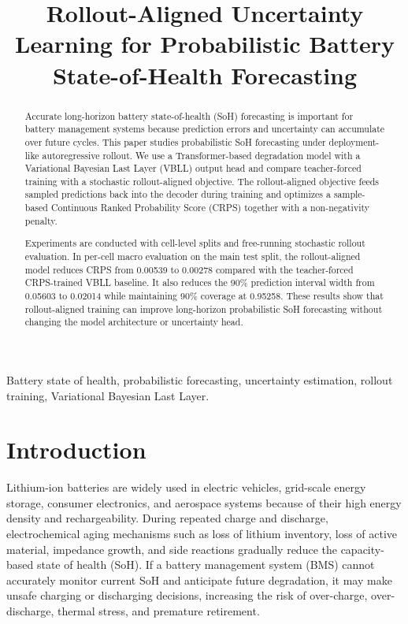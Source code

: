\documentclass[conference]{IEEEtran}
\begin{document}
\title{Rollout-Aligned Uncertainty Learning for Probabilistic Battery State-of-Health Forecasting}

\author{
}

\maketitle

\begin{abstract}
Accurate long-horizon battery state-of-health (SoH) forecasting is important
for battery management systems because prediction errors and uncertainty can
accumulate over future cycles. This paper studies probabilistic SoH forecasting
under deployment-like autoregressive rollout. We use a Transformer-based
degradation model with a Variational Bayesian Last Layer (VBLL) output head and
compare teacher-forced training with a stochastic rollout-aligned objective.
The rollout-aligned objective feeds sampled predictions back into the decoder
during training and optimizes a sample-based Continuous Ranked Probability
Score (CRPS) together with a non-negativity penalty.

Experiments are conducted with cell-level splits and free-running stochastic
rollout evaluation. In per-cell macro evaluation on the main test split, the
rollout-aligned model reduces CRPS from 0.00539 to 0.00278 compared with the
teacher-forced CRPS-trained VBLL baseline. It also reduces the 90\% prediction
interval width from 0.05603 to 0.02014 while maintaining 90\% coverage at
0.95258. These results show that rollout-aligned training can improve
long-horizon probabilistic SoH forecasting without changing the model
architecture or uncertainty head.
\end{abstract}

\begin{IEEEkeywords}
Battery state of health, probabilistic forecasting, uncertainty estimation,
rollout training, Variational Bayesian Last Layer.
\end{IEEEkeywords}

\section{Introduction}

Lithium-ion batteries are widely used in electric vehicles, grid-scale energy
storage, consumer electronics, and aerospace systems because of their high
energy density and rechargeability. During repeated charge and discharge,
electrochemical aging mechanisms such as loss of lithium inventory, loss of
active material, impedance growth, and side reactions gradually reduce the
capacity-based state of health (SoH). If a battery management system (BMS)
cannot accurately monitor current SoH and anticipate future degradation, it
may make unsafe charging or discharging decisions, increasing the risk of
over-charge, over-discharge, thermal stress, and premature retirement.
\end{document}
